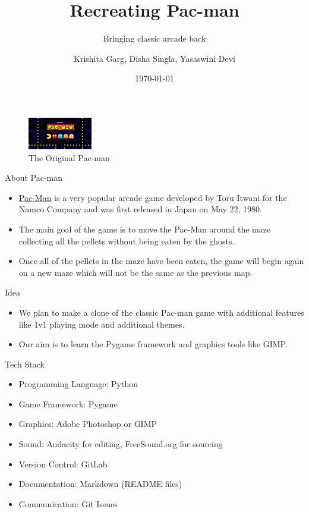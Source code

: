 \documentclass{beamer}
\title{Recreating Pac-man}
\subtitle{Bringing classic arcade back}
\author{Krishita Garg, Disha Singla, Yasaswini Devi}
\date{\today}
\begin{document}
\begin{frame}
	\titlepage	
	\begin{figure}
	\centering
    		\includegraphics[width=0.25\textwidth]{Pac-man pic}
		\caption{The Original Pac-man}
	\end{figure}
\end{frame}

\begin{frame}{About Pac-man}
        \begin{itemize}
		\item \href{https://pacman.com/en/}{Pac-Man} is a very popular arcade game developed by Toru Itwani for the Namco Company and was first released in Japan on May 22, 1980. 
		\item The main goal of the game is to move the Pac-Man around the maze collecting all the pellets without being eaten by the ghosts. 
		\item Once all of the pellets in the maze have been eaten, the game will begin again on a new maze which will not be the same as the previous map. 
	\end{itemize}
\end{frame}

\begin{frame}{Idea}
	\begin{itemize}
		\item We plan to make a clone of the classic Pac-man game with additional features like 1v1 playing mode and additional themes. 
		\item Our aim is to learn the Pygame framework and graphics tools like GIMP.
	\end{itemize}
\end{frame}

\begin{frame}{Tech Stack}
        \begin{itemize}
                \item Programming Language: Python
		\item Game Framework: Pygame
		\item Graphics: Adobe Photoshop or GIMP
		\item Sound: Audacity for editing, FreeSound.org for sourcing
		\item Version Control: GitLab
		\item Documentation: Markdown (README files)
		\item Communication: Git Issues
        \end{itemize}
\end{frame}
\end{document}
